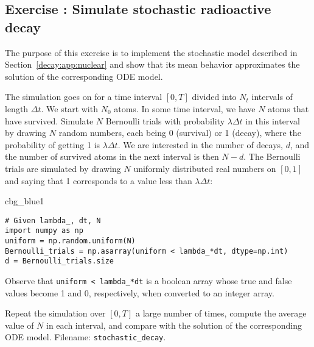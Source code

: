 \documentclass[graybox,sectrefs,envcountresetchap,open=right,final]{svmonodo}
\newenvironment{_cod_tight}[1]{
   \def\FrameCommand{\colorbox{#1}}
   \FrameRule0.6pt\MakeFramed {\FrameRestore}\vskip3mm}
   {\vskip0mm\endMakeFramed}
\newenvironment{cod}[1]{
\bgroup\rmfamily
\fboxsep=0mm\relax
\begin{_cod_tight}{#1}
\list{}{\parsep=-2mm\parskip=0mm\topsep=0pt\leftmargin=2mm
\rightmargin=2\leftmargin\leftmargin=4pt\relax}
\item\relax}
{\endlist\end{_cod_tight}\egroup}
\newenvironment{doconceexercise}{}{}
\newcounter{doconceexercisecounter}
\begin{document}
\begin{doconceexercise}

\subsection*{Exercise \thedoconceexercisecounter: Simulate stochastic radioactive decay}

\label{decay:app:exer:stoch:nuclear}

The purpose of this exercise is to implement the stochastic model
described in Section~\ref{decay:app:nuclear} and show that its
mean behavior approximates the solution of the corresponding
ODE model.

The simulation goes on for a time interval $[0,T]$ divided into
$N_t$ intervals of length $\Delta t$. We start with $N_0$
atoms. In some time interval, we have $N$ atoms that have survived.
Simulate $N$ Bernoulli trials with probability $\lambda\Delta t$
in this interval by drawing $N$ random numbers, each being 0 (survival)
or 1 (decay), where the probability of getting 1 is $\lambda\Delta t$.
We are interested in the number of decays, $d$, and the number of
survived atoms in the next interval is then $N-d$.
The Bernoulli trials
are simulated by drawing $N$ uniformly distributed real numbers on
$[0,1]$ and saying that 1 corresponds to a value less than $\lambda\Delta t$:

\begin{cod}{cbg_blue1}\begin{Verbatim}[numbers=none,fontsize=\fontsize{9pt}{9pt},baselinestretch=0.95,xleftmargin=2mm]
# Given lambda_, dt, N
import numpy as np
uniform = np.random.uniform(N)
Bernoulli_trials = np.asarray(uniform < lambda_*dt, dtype=np.int)
d = Bernoulli_trials.size
\end{Verbatim}
\end{cod}
\noindent
Observe that \Verb!uniform < lambda_*dt! is a boolean array whose true
and false values become 1 and 0, respectively, when converted to an
integer array.

Repeat the simulation over $[0,T]$ a large number of times, compute the average
value of $N$ in each interval, and compare with the solution of
the corresponding ODE model.
\noindent Filename: \Verb!stochastic_decay!.

\end{doconceexercise}
\end{document}
